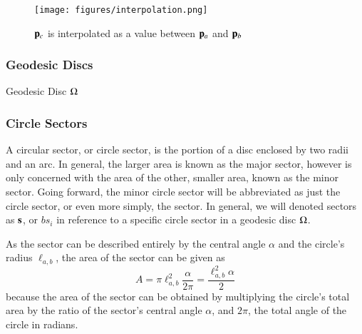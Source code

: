 \begin{figure}
\ffigbox
	{\texttt{[image: figures/interpolation.png]}}
	{\caption[Interpolation between two points in $\mathbb{R}^2$]{$\mathbf{p}_c$ is interpolated as a value between $\mathbf{p}_a$ and $\mathbf{p}_b$}\label{fig:interpolation}}
\end{figure}

%
\subsubsection{Geodesic Discs}
\label{ch2sBssGsssGD}
Geodesic Disc $\Omega$%
%
%

%
\subsubsection{Circle Sectors}
\label{ch2sBssGsssCS}
A circular sector, or circle sector, is the portion of a disc enclosed by two radii and an arc. In general, the larger area is known as the major sector, however  is only concerned with the area of the other, smaller area, known as the minor sector. Going forward, the minor circle sector will be abbreviated as just the circle sector, or even more simply, the sector. In general, we will denoted sectors as $\mathbf{s}$, or $bs_i$ in reference to a specific circle sector in a geodesic disc $\Omega$.%
%
%
%

As the sector can be described entirely by the central angle $\alpha$ and the circle's radius $\ell_{a,b}$, the area of the sector can be given as
%
\begin{equation}
	A = \pi \ell_{a,b}^2\frac{\alpha}{2\pi} = \frac{\ell_{a,b}^2\alpha}{2}
	\label{eq:areaOfCircleSector}
\end{equation}
%
because the area of the sector can be obtained by multiplying the circle's total area by the ratio of the sector's central angle $\alpha$, and $2\pi$, the total angle of the circle in radians.~\cite{Weisstein19d}%
%

%
